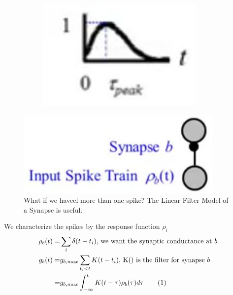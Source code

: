 \documentclass[]{article}
\newcommand\numberthis{\addtocounter{equation}{1}\tag{\theequation}}
\begin{document}
\begin{figure}[H]
\begin{subfigure}[t]{0.9\textwidth}
		\includegraphics[width=0.9\textwidth]{PS3}
	\end{subfigure}
\end{figure}

\begin{figure}[H]
	\begin{center}
		\caption[What if we have more than one spike?]{What if we haveel more than one spike? The Linear Filter Model of a Synapse is useful.}\label{fig:LinearFilter}
		\includegraphics[width=0.9\textwidth]{LinearFilter}
	\end{center}
\end{figure}

We characterize the spikes by the response function $\rho_i$
\begin{align*}
	\rho_b(t) =& \sum_{i} \delta(t-t_i) \text{, we want the synaptic conductance at $b$}\\
	g_b(t) =& g_{b,max}\sum_{t_i<t} K(t-t_i) \text{, K() is the filter for synapse $b$}\\
	=& g_{b,max}\int_{-\infty}^{t} K(t-\tau) \rho_b(\tau) d\tau \numberthis \label{eq:LinearFilter}
\end{align*}
\end{document}
